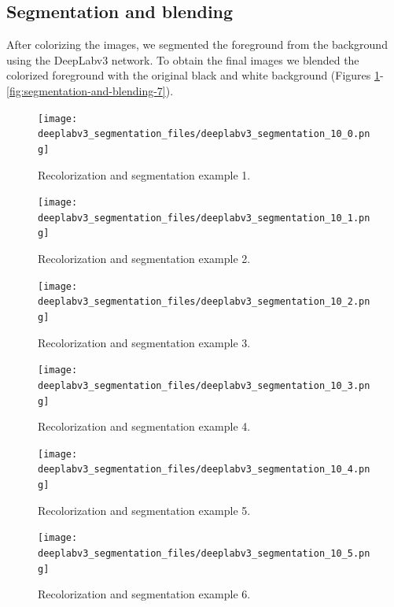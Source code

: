 \documentclass[
]{article}
\begin{document}
\hypertarget{segmentation-and-blending}{%
\subsection{Segmentation and blending}\label{segmentation-and-blending}}

After colorizing the images, we segmented the foreground from the
background using the DeepLabv3 network. To obtain the final images we
blended the colorized foreground with the original black and white
background (Figures \ref{fig:segmentation-and-blending-1}-\ref{fig:segmentation-and-blending-7}).

\begin{figure}
\centering
\texttt{[image: deeplabv3\_segmentation\_files/deeplabv3\_segmentation\_10\_0.png]}
\caption{Recolorization and segmentation example 1.}
\label{fig:segmentation-and-blending-1}
\end{figure}

\begin{figure}
\centering
\texttt{[image: deeplabv3\_segmentation\_files/deeplabv3\_segmentation\_10\_1.png]}
\caption{Recolorization and segmentation example 2.}
\label{fig:segmentation-and-blending-2}
\end{figure}

\begin{figure}
\centering
\texttt{[image: deeplabv3\_segmentation\_files/deeplabv3\_segmentation\_10\_2.png]}
\caption{Recolorization and segmentation example 3.}
\label{fig:segmentation-and-blending-3}
\end{figure}

\begin{figure}
\centering
\texttt{[image: deeplabv3\_segmentation\_files/deeplabv3\_segmentation\_10\_3.png]}
\caption{Recolorization and segmentation example 4.}
\label{fig:segmentation-and-blending-4}
\end{figure}

\begin{figure}
\centering
\texttt{[image: deeplabv3\_segmentation\_files/deeplabv3\_segmentation\_10\_4.png]}
\caption{Recolorization and segmentation example 5.}
\label{fig:segmentation-and-blending-5}
\end{figure}

\begin{figure}
\centering
\texttt{[image: deeplabv3\_segmentation\_files/deeplabv3\_segmentation\_10\_5.png]}
\caption{Recolorization and segmentation example 6.}
\label{fig:segmentation-and-blending-6}
\end{figure}
\end{document}
